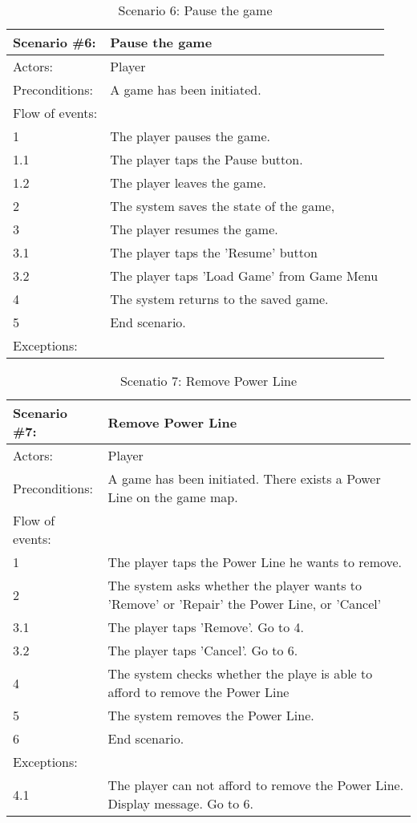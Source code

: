 \begin{table}
	\begin{tabular}{| l | p{10cm} |}
		\hline
		\rowcolor{lightgray}
		{\bf Scenario \#6:} & {\bf Pause the game} \\ \hline
		Actors: & Player \\ \hline
		Preconditions: & A game has been initiated. \\ \hline
		\rowcolor{lightergray}
		Flow of events: & \\ \hline
		1 & The player pauses the game. \\ \hline
		1.1 & The player taps the Pause button. \\ \hline
		1.2 & The player leaves the game. \\ \hline
		2 & The system saves the state of the game, \\ \hline
		3 & The player resumes the game. \\ \hline
		3.1 & The player taps the 'Resume' button \\ \hline
		3.2 & The player taps 'Load Game' from Game Menu \\ \hline
		4 & The system returns to the saved game. \\ \hline
		5 & End scenario. \\ \hline
		\rowcolor{lightergray}
		Exceptions: & \\ \hline
	\end{tabular}
	\caption{Scenario 6: Pause the game}
\end{table}

\begin{table}
	\begin{tabular}{| l | p{10cm} |}
		\hline
		\rowcolor{lightgray}
		{\bf Scenario \#7:} & {\bf Remove Power Line} \\ \hline
		Actors: & Player \\ \hline
		Preconditions: & A game has been initiated. There exists a Power Line on the game map. \\ \hline
		\rowcolor{lightergray}		
		Flow of events: & \\ \hline
		1 & The player taps the Power Line he wants to remove. \\ \hline
		2 & The system asks whether the player wants to 'Remove' or 'Repair' the Power Line, or 'Cancel' \\ \hline
		3.1 & The player taps 'Remove'. Go to 4. \\ \hline
		3.2 & The player taps 'Cancel'. Go to 6. \\ \hline
		4 & The system checks whether the playe is able to afford to remove the Power Line \\ \hline
		5 & The system removes the Power Line. \\ \hline
		6 & End scenario. \\ \hline
		\rowcolor{lightergray}
		Exceptions: & \\ \hline
		4.1 & The player can not afford to remove the Power Line. Display message. Go to 6. \\ \hline
	\end{tabular}
	\caption{Scenatio 7: Remove Power Line}
\end{table}

